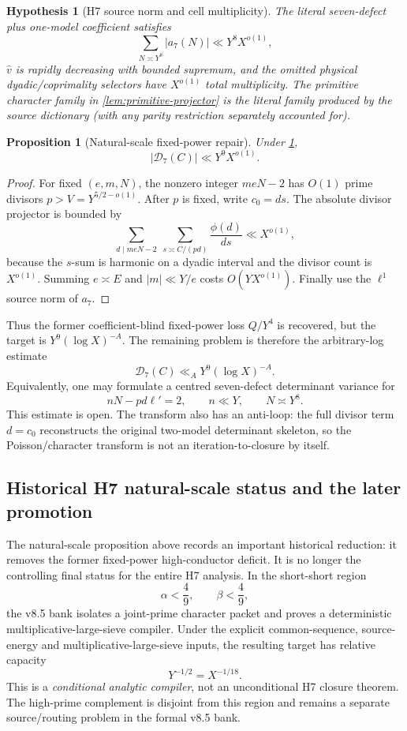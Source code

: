 \documentclass[11pt]{article}
\newtheorem{proposition}[proposition]{Proposition}
\newtheorem{hypothesis}[hypothesis]{Hypothesis}
\theoremstyle{definition}
\newcommand{\1}{\mathbf 1}
\begin{document}
\begin{hypothesis}[H7 source norm and cell multiplicity]
\label{hyp:h7-source-norm}
The literal seven-defect plus one-model coefficient satisfies
\[
   \sum_{N\asymp Y^8}|a_7(N)|\ll Y^8X^{o(1)},
\]
$\widehat v$ is rapidly decreasing with bounded supremum, and the omitted
physical dyadic/coprimality selectors have $X^{o(1)}$ total multiplicity.
The primitive character family in \cref{lem:primitive-projector} is the
literal family produced by the source dictionary (with any parity restriction
separately accounted for).
\end{hypothesis}

\begin{proposition}[Natural-scale fixed-power repair]
\label{prop:h7-natural}
Under \cref{hyp:h7-source-norm},
\[
   |\mathcal D_7(C)|\ll Y^9X^{o(1)}.
\]
\end{proposition}
\begin{proof}
For fixed $(e,m,N)$, the nonzero integer $meN-2$ has $O(1)$ prime divisors
$p>V=Y^{5/2-o(1)}$.  After $p$ is fixed, write $c_0=ds$.  The absolute divisor
projector is bounded by
\[
 \sum_{d\mid meN-2}\ \sum_{s\asymp C/(pd)}
   \frac{\phi(d)}{ds}
 \ll X^{o(1)},
\]
because the $s$-sum is harmonic on a dyadic interval and the divisor count is
$X^{o(1)}$.  Summing $e\asymp E$ and
$|m|\ll Y/e$ costs $O(YX^{o(1)})$.  Finally use the $\ell^1$ source norm of
$a_7$.
\end{proof}
Thus the former coefficient-blind fixed-power loss $Q/Y^4$ is recovered, but
the target is $Y^9(\log X)^{-A}$.  The remaining problem is therefore the
arbitrary-log estimate
\[
   \boxed{\mathcal D_7(C)\ll_A Y^9(\log X)^{-A}.}
\]
Equivalently, one may formulate a centred seven-defect determinant variance
for
\[
   nN-pd\ell'=2,
   \qquad n\ll Y,
   \qquad N\asymp Y^8.
\]
This estimate is open.  The transform also has an anti-loop: the full divisor
term $d=c_0$ reconstructs the original two-model determinant skeleton, so the
Poisson/character transform is not an iteration-to-closure by itself.

\subsection{Historical H7 natural-scale status and the later promotion}
\label{sec:h7-historical-promotion}
The natural-scale proposition above records an important historical reduction:
it removes the former fixed-power high-conductor deficit.  It is no longer the
controlling final status for the entire H7 analysis.  In the short-short region
\[
   \alpha<\frac49,\qquad \beta<\frac49,
\]
the v8.5 bank isolates a joint-prime character packet and proves a deterministic
multiplicative-large-sieve compiler.  Under the explicit common-sequence,
source-energy and multiplicative-large-sieve inputs, the resulting target has
relative capacity
\[
    Y^{-1/2}=X^{-1/18}.
\]
This is a \emph{conditional analytic compiler}, not an unconditional H7
closure theorem.  The high-prime complement is disjoint from this region and
remains a separate source/routing problem in the formal v8.5 bank.
\end{document}
